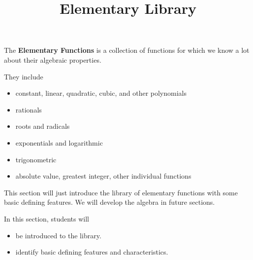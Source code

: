 \documentclass{ximera}
\title{Elementary Library}
\begin{document}
\begin{abstract}
\end{abstract}
\maketitle




The \textbf{Elementary Functions} is a collection of functions for which we know a lot about their algebraic properties.

They include 

\begin{itemize}
\item constant, linear, quadratic, cubic, and other polynomials
\item rationals
\item roots and radicals
\item exponentials and logarithmic
\item trigonometric
\item absolute value, greatest integer, other individual functions
\end{itemize}



This section will just introduce the library of elementary functions with some basic defining features.  We will develop the algebra in future sections.














\begin{sectionOutcomes}
In this section, students will 

\begin{itemize}
\item be introduced to the library.
\item identify basic defining features and characteristics.
\end{itemize}
\end{sectionOutcomes}
\end{document}
